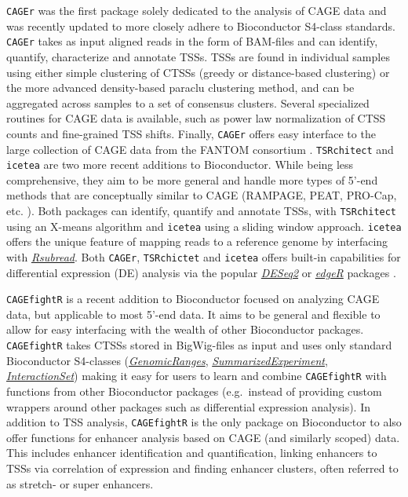 \documentclass[9pt,a4paper,]{extarticle}
\begin{document}
\texttt{CAGEr} was the first package solely dedicated to the analysis of CAGE data and was recently updated to more closely adhere to Bioconductor S4-class standards. \texttt{CAGEr} takes as input aligned reads in the form of BAM-files and can identify, quantify, characterize and annotate TSSs. TSSs are found in individual samples using either simple clustering of CTSSs (greedy or distance-based clustering) or the more advanced density-based paraclu clustering method\citep{Frith2008a}, and can be aggregated across samples to a set of consensus clusters. Several specialized routines for CAGE data is available, such as power law normalization of CTSS counts and fine-grained TSS shifts. Finally, \texttt{CAGEr} offers easy interface to the large collection of CAGE data from the FANTOM consortium \citep{Consortium2014}. \texttt{TSRchitect} and \texttt{icetea} are two more recent additions to Bioconductor. While being less comprehensive, they aim to be more general and handle more types of 5'-end methods that are conceptually similar to CAGE (RAMPAGE, PEAT, PRO-Cap, etc. \citep{Adiconis2018}). Both packages can identify, quantify and annotate TSSs, with \texttt{TSRchitect} using an X-means algorithm and \texttt{icetea} using a sliding window approach. \texttt{icetea} offers the unique feature of mapping reads to a reference genome by interfacing with \emph{\href{https://bioconductor.org/packages/3.8/Rsubread}{Rsubread}}. Both \texttt{CAGEr}, \texttt{TSRchictet} and \texttt{icetea} offers built-in capabilities for differential expression (DE) analysis via the popular \emph{\href{https://bioconductor.org/packages/3.8/DESeq2}{DESeq2}} or \emph{\href{https://bioconductor.org/packages/3.8/edgeR}{edgeR}} packages \citep{Love2014, Robinson2010}.

\texttt{CAGEfightR} is a recent addition to Bioconductor focused on analyzing CAGE data, but applicable to most 5'-end data. It aims to be general and flexible to allow for easy interfacing with the wealth of other Bioconductor packages. \texttt{CAGEfightR} takes CTSSs stored in BigWig-files as input and uses only standard Bioconductor S4-classes (\emph{\href{https://bioconductor.org/packages/3.8/GenomicRanges}{GenomicRanges}}, \emph{\href{https://bioconductor.org/packages/3.8/SummarizedExperiment}{SummarizedExperiment}}, \emph{\href{https://bioconductor.org/packages/3.8/InteractionSet}{InteractionSet}}\citep{Lawrence2013, Lun2016}) making it easy for users to learn and combine \texttt{CAGEfightR} with functions from other Bioconductor packages (e.g.~instead of providing custom wrappers around other packages such as differential expression analysis). In addition to TSS analysis, \texttt{CAGEfightR} is the only package on Bioconductor to also offer functions for enhancer analysis based on CAGE (and similarly scoped) data. This includes enhancer identification and quantification, linking enhancers to TSSs via correlation of expression and finding enhancer clusters, often referred to as stretch- or super enhancers.
\end{document}
